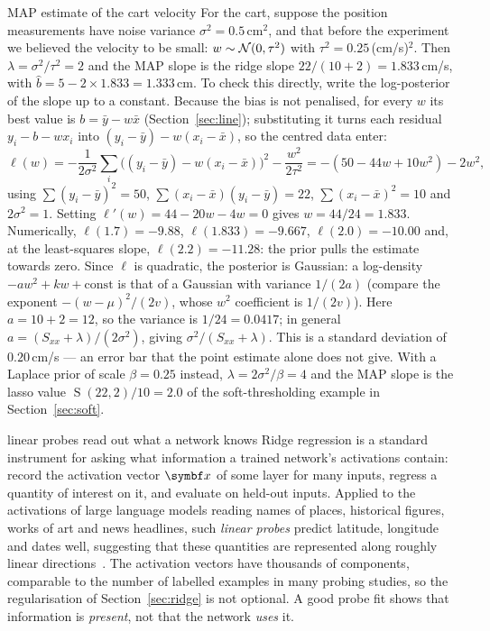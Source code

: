 \documentclass[11pt]{article}
\newcommand{\soft}{\operatorname{S}}
\begin{document}
\begin{worked}{MAP estimate of the cart velocity}
For the cart, suppose the position measurements have noise variance $\sigma^2 = 0.5$\,cm$^2$, and that before the
experiment we believed the velocity to be small: $w \sim \mathcal{N}(0, \tau^2)$ with $\tau^2 = 0.25$\,(cm/s)$^2$. Then
$\lambda = \sigma^2/\tau^2 = 2$ and the MAP slope is the ridge slope $22/(10 + 2) = 1.833$\,cm/s, with
$\hat b = 5 - 2 \times 1.833 = 1.333$\,cm. To check this directly, write the log-posterior of the slope up to a
constant. Because the bias is not penalised, for every $w$ its best value is $b = \bar y - w\bar x$
(Section~\ref{sec:line}); substituting it turns each residual $y_i - b - wx_i$ into $(y_i - \bar y) - w(x_i - \bar x)$, so
the centred data enter:
\[
  \ell(w) = -\frac{1}{2\sigma^2}\sum_i \big((y_i - \bar y) - w(x_i - \bar x)\big)^2 - \frac{w^2}{2\tau^2}
          = -(50 - 44w + 10w^2) - 2w^2 ,
\]
using $\sum (y_i - \bar y)^2 = 50$, $\sum (x_i - \bar x)(y_i - \bar y) = 22$, $\sum (x_i - \bar x)^2 = 10$ and $2\sigma^2 = 1$.
Setting $\ell'(w) = 44 - 20w - 4w = 0$ gives $w = 44/24 = 1.833$. Numerically, $\ell(1.7) = -9.88$, $\ell(1.833) = -9.667$,
$\ell(2.0) = -10.00$ and, at the least-squares slope, $\ell(2.2) = -11.28$: the prior pulls the estimate towards zero. Since
$\ell$ is quadratic, the posterior is Gaussian: a log-density $-aw^2 + kw + \text{const}$ is that of a Gaussian with
variance $1/(2a)$ (compare the exponent $-(w - \mu)^2/(2v)$, whose $w^2$ coefficient is $1/(2v)$). Here $a = 10 + 2 = 12$,
so the variance is $1/24 = 0.0417$; in general $a = (S_{xx} + \lambda)/(2\sigma^2)$, giving $\sigma^2/(S_{xx} + \lambda)$.
This is a standard deviation of $0.20$\,cm/s --- an error bar that the point estimate alone does not give. With a Laplace prior of
scale $\beta = 0.25$ instead, $\lambda = 2\sigma^2/\beta = 4$ and the MAP slope is the lasso value $\soft(22, 2)/10 = 2.0$
of the soft-thresholding example in Section~\ref{sec:soft}.
\end{worked}

\begin{modern}{linear probes read out what a network knows}
Ridge regression is a standard instrument for asking what information a trained network's activations contain: record
the activation vector $\x$ of some layer for many inputs, regress a quantity of interest on it, and evaluate on held-out
inputs. Applied to the activations of large language models reading names of places, historical figures, works of art and
news headlines, such
\emph{linear probes} predict latitude, longitude and dates well, suggesting that these quantities are represented along
roughly linear directions~\cite{gurnee2024}. The activation vectors have thousands of components, comparable to the
number of labelled examples in many probing studies, so the regularisation of Section~\ref{sec:ridge} is not optional. A
good probe fit shows that information is \emph{present}, not that the network \emph{uses} it.
\end{modern}
\end{document}
